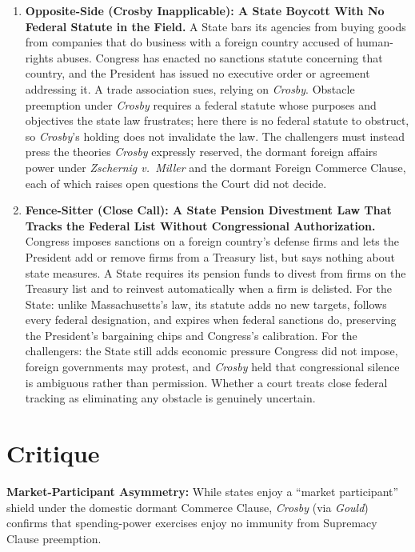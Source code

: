 \documentclass[12pt]{article}
\begin{document}
\begin{enumerate}
\item \textbf{Opposite-Side (Crosby Inapplicable): A State Boycott With No Federal Statute in the Field.} A State bars its agencies from buying goods from companies that do business with a foreign country accused of human-rights abuses. Congress has enacted no sanctions statute concerning that country, and the President has issued no executive order or agreement addressing it. A trade association sues, relying on \textit{Crosby}. Obstacle preemption under \textit{Crosby} requires a federal statute whose purposes and objectives the state law frustrates; here there is no federal statute to obstruct, so \textit{Crosby}'s holding does not invalidate the law. The challengers must instead press the theories \textit{Crosby} expressly reserved, the dormant foreign affairs power under \textit{Zschernig v.\ Miller} and the dormant Foreign Commerce Clause, each of which raises open questions the Court did not decide.

\item \textbf{Fence-Sitter (Close Call): A State Pension Divestment Law That Tracks the Federal List Without Congressional Authorization.} Congress imposes sanctions on a foreign country's defense firms and lets the President add or remove firms from a Treasury list, but says nothing about state measures. A State requires its pension funds to divest from firms on the Treasury list and to reinvest automatically when a firm is delisted. For the State: unlike Massachusetts's law, its statute adds no new targets, follows every federal designation, and expires when federal sanctions do, preserving the President's bargaining chips and Congress's calibration. For the challengers: the State still adds economic pressure Congress did not impose, foreign governments may protest, and \textit{Crosby} held that congressional silence is ambiguous rather than permission. Whether a court treats close federal tracking as eliminating any obstacle is genuinely uncertain.

\end{enumerate}

\section{Critique}
\textbf{Market-Participant Asymmetry:} While states enjoy a ``market participant'' shield under the domestic dormant Commerce Clause, \textit{Crosby} (via \textit{Gould}) confirms that spending-power exercises enjoy no immunity from Supremacy Clause preemption.
\end{document}
